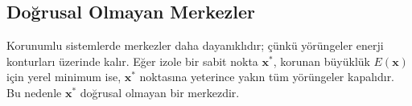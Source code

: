 \subsection*{Doğrusal Olmayan Merkezler}

\begin{justify}
Korunumlu sistemlerde merkezler daha dayanıklıdır; çünkü yörüngeler enerji konturları üzerinde kalır. Eğer izole bir sabit nokta $\mathbf{x}^{*}$, korunan büyüklük $E(\mathbf{x})$ için yerel minimum ise, $\mathbf{x}^{*}$ noktasına yeterince yakın tüm yörüngeler kapalıdır. Bu nedenle $\mathbf{x}^{*}$ doğrusal olmayan bir merkezdir.
\end{justify}

\newpage